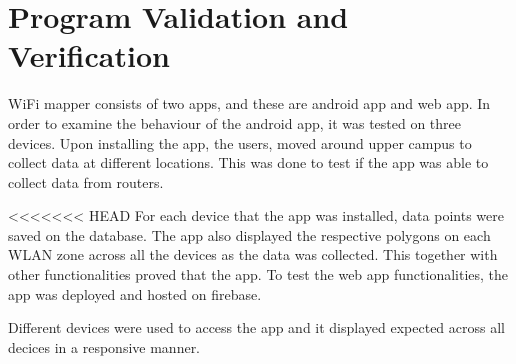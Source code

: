 \section{Program Validation and Verification}
\label{ss:progr-valid-verif}


WiFi mapper consists of two apps, and these are android app and web app. In order to examine the behaviour of the android app, it was tested on three devices. Upon installing the app, the users, moved around upper campus to collect data at different locations. This was done to test if the app was able to collect data from routers.

<<<<<<< HEAD
For each device that the app was installed, data points were saved on the database. The app also displayed the respective polygons on each WLAN zone across all the devices as the data was collected. This together with other functionalities proved that the app. To test the web app functionalities, the app was deployed and hosted on firebase.

Different devices were used to access the app and it displayed expected across all decices in a responsive manner.

